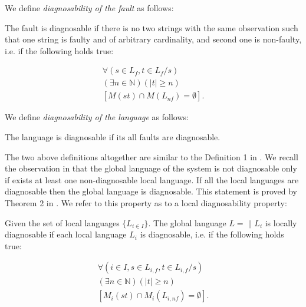 \documentclass[a4paper, 10pt, conference]{ieeeconf}
\begin{document}


We define \emph{diagnosability of the fault} as follows:
\begin{definition} 
\label{def:fault_is_diag}
The fault is diagnosable if there is no two strings
with the same observation such that one string is faulty and of arbitrary
cardinality, and second one is non-faulty, i.e. if the following holds true:
\end{definition}
\begin{equation}
\begin{array}{l}
	\forall(s \in L_f, t \in L_f/s) 
	\\
	(\exists n \in \mathbb{N})
	(|t| \geq n) 
	\\
	\left[ M(st) \cap M(L_{nf}) = \emptyset \right].
\end{array}
\end{equation}

We define \emph{diagnosability of the language} as follows:
\begin{definition}
The language is diagnosable if its all faults are diagnosable.
\end{definition}
The two above definitions altogether are similar to the Definition 1 in
\cite{sampath_diagnosability_1995}. We recall the observation in
\cite{contant_diagnosability_2006} that the global language of the system is not
diagnosable only if exists at least one non-diagnosable local language.
If all the local languages are diagnosable then the global language is
diagnosable. This statement is proved by Theorem 2 in
\cite{contant_diagnosability_2006}. We refer to this property as to a local
diagnosability property:

\begin{definition} Given the set of local languages
$\{L_{i \in I}\}$. The global language $L = \parallel L_i$ is
locally diagnosable if each local language $L_i$ is diagnosable, i.e. if
the following holds true:
\end{definition}
\begin{equation}
\begin{array}{l}
	\forall(i \in I, s \in L_{i,f}, t \in L_{i,f}/s)
	\\
	(\exists n \in \mathbb{N})
	(|t| \geq n)
	\\
	\left[ M_i(st) \cap M_i(L_{i,nf}) = \emptyset \right].
\end{array}
\end{equation}
\end{document}
